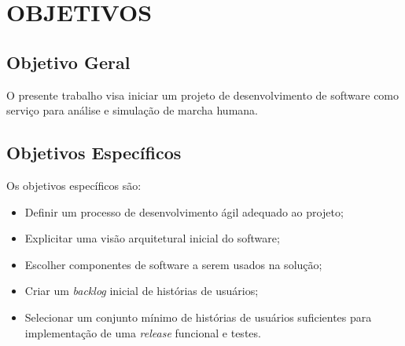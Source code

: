 \section[OBJETIVOS]{OBJETIVOS}

\subsection[Objetivo Geral]{\textbf{Objetivo Geral}}
O presente trabalho visa iniciar um projeto de desenvolvimento de software como serviço para análise e simulação de marcha humana.

\subsection[Objetivo Específicos]{\textbf{Objetivos Específicos}}
Os objetivos específicos são:
\begin{itemize}
	\item Definir um processo de desenvolvimento ágil adequado ao projeto;
	\item Explicitar uma visão arquitetural inicial do software;
	\item Escolher componentes de software a serem usados na solução;
	\item Criar um \emph{backlog} inicial de histórias de usuários;
	\item Selecionar um conjunto mínimo de histórias de usuários suficientes para implementação de uma \emph{release} funcional e testes.
\end{itemize}
